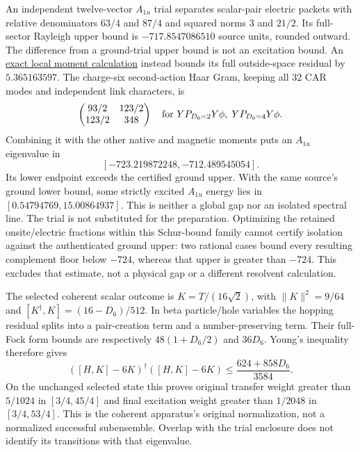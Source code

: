 An independent twelve-vector $A_{1u}$ trial separates scalar-pair
electric packets with relative denominators $63/4$ and $87/4$ and
squared norms $3$ and $21/2$. Its full-sector Rayleigh upper bound is
$-717.8547086510$ source units, rounded outward. The difference from a ground-trial
upper bound is not an excitation bound. An
\href{https://github.com/FloatingPragma/observer-patch-holography/blob/main/model/particle_primary_odd_residual/PROOF.md}{exact local moment calculation}
instead bounds its full outside-space residual by $5.365163597$.
The charge-six second-action Haar Gram, keeping all 32 CAR modes and
independent link characters, is
\[
 \begin{pmatrix}93/2&123/2\\123/2&348\end{pmatrix}
 \quad\hbox{for }YP_{D_6=2}Y\phi,\;YP_{D_6=4}Y\phi.
\]
Combining it with the other native and magnetic moments puts an
$A_{1u}$ eigenvalue in
\[
 [-723.219872248,-712.489545054].
\]
Its lower endpoint exceeds the certified ground upper. With the same
source's ground lower bound, some strictly excited $A_{1u}$ energy lies
in $[0.54794769,15.00864937]$. This is neither a global gap nor an
isolated spectral line. The trial is not substituted for the preparation.
Optimizing the retained onsite/electric fractions within this Schur-bound
family cannot certify isolation against the authenticated ground upper:
two rational cases bound every resulting complement floor below $-724$,
whereas that upper is greater than $-724$. This excludes that estimate,
not a physical gap or a different resolvent calculation.

The selected coherent scalar outcome is
$K=T/(16\sqrt2)$, with $\|K\|^2=9/64$ and
$[K^\dagger,K]=(16-D_6)/512$. In beta particle/hole variables the
hopping residual splits into a pair-creation term and a number-preserving
term. Their full-Fock form bounds are respectively $48(1+D_6/2)$ and
$36D_6$. Young's inequality therefore gives
\[
 ([H,K]-6K)^\dagger([H,K]-6K)\le\frac{624+858D_6}{3584}.
\]
On the unchanged selected state this proves original transfer weight
greater than $5/1024$ in $[3/4,45/4]$ and final excitation weight greater
than $1/2048$ in $[3/4,53/4]$. This is the coherent apparatus's original
normalization, not a normalized successful subensemble. Overlap with
the trial enclosure does not identify its transitions with that eigenvalue.

